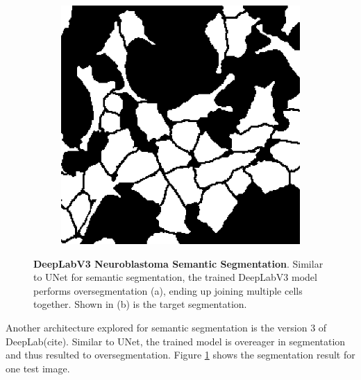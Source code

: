\documentclass[journal]{IEEEtran}
\begin{document}
\begin{figure}
\begin{subfigure}[b]{0.45\linewidth}
\includegraphics[width=\linewidth]{unet/110115.jpg}
\caption{}
\end{subfigure}
\caption{\textbf{DeepLabV3 Neuroblastoma Semantic Segmentation}. Similar to UNet for semantic segmentation, the trained DeepLabV3 model performs oversegmentation (a), ending up joining multiple cells together. Shown in (b) is the target segmentation.}
\label{fig:deeplab_results}
\end{figure}
Another architecture explored for semantic segmentation is the version 3 of DeepLab(cite). Similar to UNet, the trained model is overeager in segmentation and thus resulted to oversegmentation. Figure \ref{fig:deeplab_results} shows the segmentation result for one test image.
\end{document}
